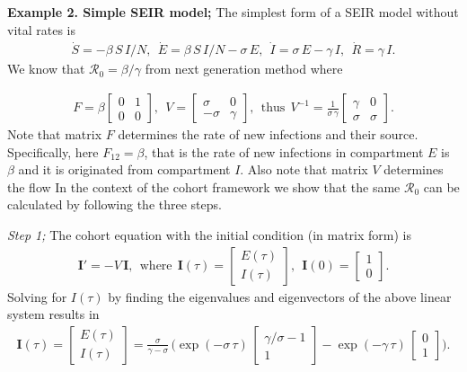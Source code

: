 \documentclass[12pt]{article}
\DeclareRobustCommand\_{\ifmmode\expandafter\subtxt\else\textunderscore\fi}
\newcommand{\R}{\ensuremath{\mathcal{R}_0}}
\renewcommand{\vec}[1]{\ensuremath{\mathbf{#1}}} %
\theoremstyle{definition} %
\begin{document}
\noindent
{\bf Example 2. Simple SEIR model;}
The simplest form of a SEIR model without vital rates is 
\begin{align}\label{mo:sier1}
\dot S=-\beta\,S\,I/N,~~
\dot E= \beta\,S\,I/N -\sigma\,E,~~
\dot I= \sigma\,E -\gamma\,I,~~
\dot R= \gamma\,I.
\end{align}
We know that $\R=\beta/\gamma$ from next generation method where 

\begin{align}
\label{seir1FV}
F = \beta \left[ \begin {array}{cc} 
0 & 1 \\
0 & 0
 \end {array} \right],~~
V=
 \left[ \begin {array}{cc}
 \sigma & 0 \\
-\sigma & \gamma
\end {array} \right],
~~ \text{thus}~~
V^{-1} = \frac{1}{\sigma\,\gamma}
\left[ \begin {array}{cc}
\gamma & 0 \\
\sigma & \sigma
\end {array} \right].
\end{align}
Note that matrix $F$ determines the rate of new infections and their source. Specifically, here $F_{12}=\beta$, that is the rate of new infections in compartment $E$ is $\beta$ and it is originated from compartment $I$.  Also note that matrix $V$ determines the flow   
In the context of the cohort framework we show that the same $\R$ can be calculated by following the three steps.

{\it Step 1;} The cohort equation with the initial condition (in matrix form) is 
\begin{align}
\vec I'=-V\,\vec I,~~ \text{where}~~ \vec I(\tau)=\left[ \begin {array}{c} E(\tau)\\I(\tau) \end {array} \right], ~~
\vec I(0)=\left[ \begin {array}{c} 1\\0 \end {array} \right].
\end{align}
Solving for $I(\tau)$ by finding the eigenvalues and eigenvectors of the above linear system results in
\begin{align}
\vec I(\tau) = \left[ \begin {array}{c} E(\tau)\\I(\tau) \end {array} \right] =
\frac{\sigma}{\gamma-\sigma}\,\Big( \exp(-\sigma\,\tau)\,\left[ \begin {array}{c} \gamma/\sigma-1\\1 \end {array} \right] 
- \exp(-\gamma\,\tau)\,\left[ \begin {array}{c} 0\\1 \end {array} \right] \Big).
\end{align}
\end{document}
